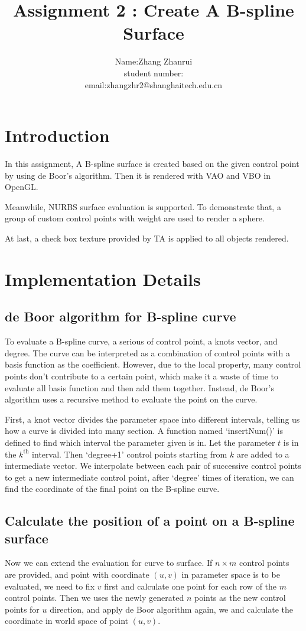 \documentclass[acmtog]{acmart}
\title{Assignment 2 : Create A B-spline Surface}
\author{Name:\quad Zhang Zhanrui  \\ student number:\quad 2019533227
	\\email:\quad zhangzhr2@shanghaitech.edu.cn}
\begin{document}
\maketitle

\vspace*{2 ex}


\section{Introduction}
In this assignment, A B-spline surface is created based on the given control point by using de Boor's algorithm. Then it is rendered with VAO and VBO in OpenGL.

Meanwhile, NURBS surface evaluation is supported. To demonstrate that, a group of custom control points with weight are used to render a sphere.

At last, a check box texture provided by TA is applied to all objects rendered.

\section{Implementation Details}
\subsection{de Boor algorithm for B-spline curve}
To evaluate a B-spline curve, a serious of control point, a knots vector, and degree. The curve can be interpreted as a combination of control points with a basis function as the coefficient. However, due to the local property, many control points don't contribute to a certain point, which make it a waste of time to evaluate all basis function and then add them together. Instead, de Boor's algorithm uses a recursive method to evaluate the point on the curve.

First, a knot vector divides the parameter space into different intervals, telling us how a curve is divided into many section. A function named `insertNum()' is defined to find which interval the parameter given is in. Let the parameter $t$ is in the $k^{\mathrm{th}}$ interval. Then `degree+1' control points starting from $k$ are added to a intermediate vector.
We interpolate between each pair of successive control points to get a new intermediate control point, after `degree' times of iteration, we can find the coordinate of the final point on the B-spline curve.

\subsection{Calculate the position of a point on a B-spline surface}
Now we can extend the evaluation for curve to surface. If $n\times m$ control points are provided, and point with coordinate $(u,v)$ in parameter space is to be evaluated, we need to fix $v$ first and calculate one point for each row of the $m$ control points. Then we uses the newly generated $n$ points as the new control points for $u$ direction, and apply de Boor algorithm again, we and calculate the coordinate in world space of point $(u, v)$.
\end{document}
